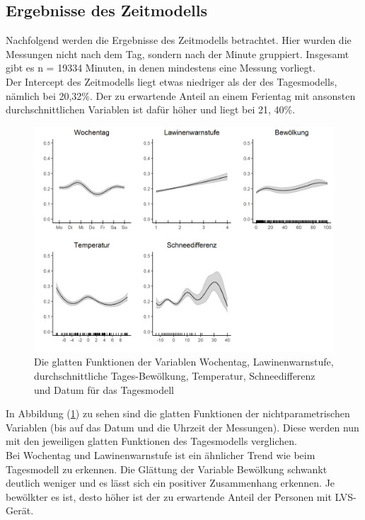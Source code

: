 \documentclass[12pt]{scrreprt}
\begin{document}
\subsection{Ergebnisse des Zeitmodells}
Nachfolgend werden die Ergebnisse des Zeitmodells betrachtet. Hier wurden die Messungen nicht nach dem Tag, sondern nach der Minute gruppiert. Insgesamt gibt es n = 19334 Minuten, in denen mindestens eine Messung vorliegt. \\
Der Intercept des Zeitmodells liegt etwas niedriger als der des Tagesmodells, nämlich bei 20,32\%. Der zu erwartende Anteil an einem Ferientag mit ansonsten durchschnittlichen Variablen ist dafür höher und liegt bei 21, 40\%. \\
\begin{figure}[H]
	\centering
	\includegraphics[width=\linewidth]{plots/smooth_time_model}
	\caption{ Die glatten Funktionen der Variablen Wochentag, Lawinenwarnstufe, durchschnittliche Tages-Bewölkung, Temperatur, Schneedifferenz und Datum für das Tagesmodell }
	\label{pic:smooth_time_model}	
\end{figure}
\noindent In Abbildung (\ref{pic:smooth_time_model}) zu sehen sind die glatten Funktionen der nichtparametrischen Variablen (bis auf das Datum und die Uhrzeit der Messungen). Diese werden nun mit den jeweiligen glatten Funktionen des Tagesmodells verglichen. \\
Bei Wochentag und Lawinenwarnstufe ist ein ähnlicher Trend wie beim Tagesmodell zu erkennen. Die Glättung der Variable Bewölkung schwankt deutlich weniger und es lässt sich ein positiver Zusammenhang erkennen. Je bewölkter es ist, desto höher ist der zu erwartende Anteil der Personen mit LVS-Gerät. \\
\end{document}
